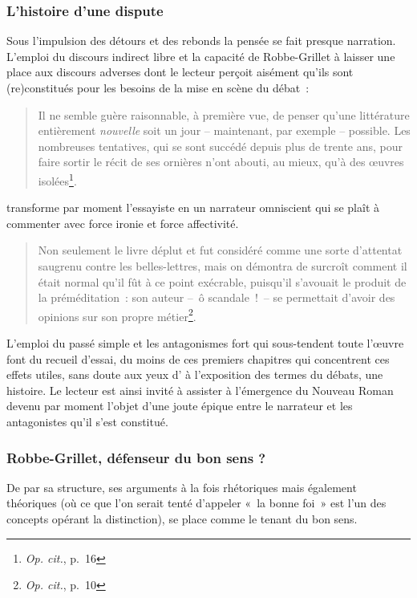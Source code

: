 \documentclass[12pt, a4paper]{article}
\begin{document}
\subsubsection{L'histoire d'une dispute}
Sous l'impulsion des détours et des rebonds la pensée se fait presque narration. L'emploi du discours indirect libre et la capacité de Robbe-Grillet à laisser une place aux discours adverses dont le lecteur perçoit aisément qu'ils sont (re)constitués pour les besoins de la mise en scène du débat~: 
\begin{quote}
    Il ne semble guère raisonnable, à première vue, de penser qu’une littérature entièrement \textit{nouvelle} soit un jour – maintenant, par exemple – possible. Les nombreuses tentatives, qui se sont succédé depuis plus de trente ans, pour faire sortir le récit de ses ornières n’ont abouti, au mieux, qu’à des œuvres isolées\footnote{\textit{Op. cit.}, p.~16}.
\end{quote}transforme par moment l'essayiste en un narrateur omniscient qui se plaît à commenter avec force ironie et force affectivité.
\begin{quote}
    Non seulement le livre déplut et fut considéré comme une sorte d’attentat saugrenu contre les belles-lettres, mais on démontra de surcroît comment il était normal qu’il fût à ce point exécrable, puisqu’il s’avouait le produit de la préméditation~: son auteur –~ô scandale~!~– se permettait d’avoir des opinions sur son propre métier\footnote{\textit{Op. cit.}, p.~10}.
\end{quote}
L'emploi du passé simple et les antagonismes fort qui sous-tendent toute l'œuvre font du recueil d'essai, du moins de ces premiers chapitres qui concentrent ces effets utiles, sans doute aux yeux d'\robbe{} à l'exposition des termes du débats, une histoire. Le lecteur est ainsi invité à assister à l'émergence du Nouveau Roman devenu par moment l'objet d'une joute épique entre le narrateur et les antagonistes qu'il s'est constitué.

\subsubsection{Robbe-Grillet, défenseur du bon sens ?}
De par sa structure, ses arguments à la fois rhétoriques mais également théoriques (où ce que l'on serait tenté d'appeler «~la bonne foi~» est l'un des concepts opérant la distinction), \robbe{} se place comme le tenant du bon sens.
\end{document}
